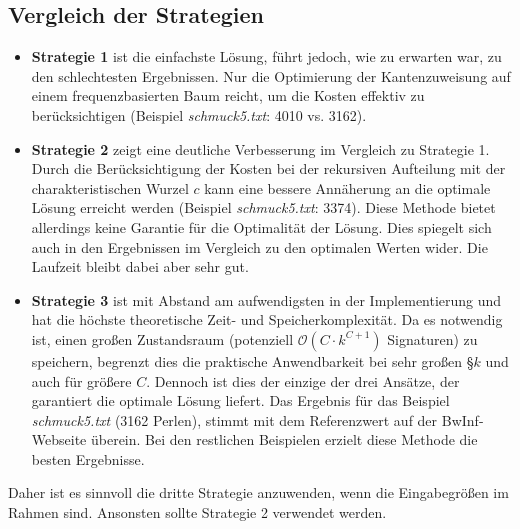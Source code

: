 \documentclass[a4paper,10pt,ngerman]{scrartcl}
\begin{document}
\subsection{Vergleich der Strategien}
\begin{itemize}
  \item \textbf{Strategie 1} ist die einfachste Lösung, führt jedoch, wie zu erwarten war, zu den schlechtesten Ergebnissen. Nur die Optimierung der Kantenzuweisung auf einem frequenzbasierten Baum reicht, um die Kosten effektiv zu berücksichtigen (Beispiel \textit{schmuck5.txt}: 4010 vs. 3162).
  \item \textbf{Strategie 2} zeigt eine deutliche Verbesserung im Vergleich zu Strategie 1. Durch die Berücksichtigung der Kosten bei der rekursiven Aufteilung mit der charakteristischen Wurzel $c$ kann eine bessere Annäherung an die optimale Lösung erreicht werden (Beispiel \textit{schmuck5.txt}: 3374). Diese Methode bietet allerdings keine Garantie für die Optimalität der Lösung. Dies spiegelt sich auch in den Ergebnissen im Vergleich zu den optimalen Werten wider. Die Laufzeit bleibt dabei aber sehr gut.
  \item \textbf{Strategie 3} ist mit Abstand am aufwendigsten in der Implementierung und hat die höchste theoretische Zeit- und Speicherkomplexität. Da es notwendig ist, einen großen Zustandsraum (potenziell $\mathcal{O}(C\cdot k^{C+1})$ Signaturen) zu speichern, begrenzt dies die praktische Anwendbarkeit bei sehr großen §$k$ und auch für größere $C$. Dennoch ist dies der einzige der drei Ansätze, der garantiert die optimale Lösung liefert. Das Ergebnis für das Beispiel \textit{schmuck5.txt} (3162 Perlen), stimmt mit dem Referenzwert auf der BwInf-Webseite überein. Bei den restlichen Beispielen erzielt diese Methode die besten Ergebnisse.
\end{itemize}
Daher ist es sinnvoll die dritte Strategie anzuwenden, wenn die Eingabegrößen im Rahmen sind. Ansonsten sollte Strategie 2 verwendet werden.
\end{document}
